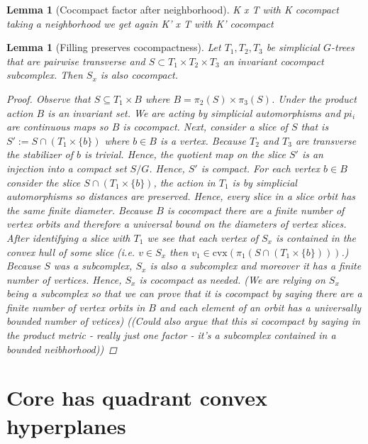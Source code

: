 \documentclass{article}
\theoremstyle{mystyle}
\newtheorem{lem}[thm]{Lemma}
\theoremstyle{remark}
\begin{document}
\begin{lem}
    [Cocompact factor after neighborhood]
    \label{lem:cocompactfactor} 
    K x T with K cocompact taking a neighborhood we get again K' x T with K' cocompact
\end{lem}
\begin{lem} 
[Filling preserves cocompactness]
\label{lem:fillingcocompact}
    Let $T_1,T_2,T_3$ be simplicial $G$-trees that are pairwise transverse and $S\subset T_1\times T_2\times T_3$ an invariant cocompact subcomplex. Then $S_x$ is also cocompact.
\begin{proof}
    Observe that $S\subseteq T_1\times B$ where $B=\pi_2(S)\times \pi_3(S)$. Under the product action $B$ is an invariant set. We are acting by simplicial automorphisms and $pi_i$ are continuous maps so $B$ is cocompact. Next, consider a slice of $S$ that is $S' := S\cap (T_1\times \{b\})$ where $b\in B$ is a vertex. Because $T_2$ and $T_3$ are transverse the stabilizer of $b$ is trivial. Hence, the quotient map on the slice $S'$ is an injection into a compact set $S/G$. Hence, $S'$ is compact. For each vertex $b\in B$ consider the slice $S\cap (T_1\times \{b\})$, the action in $T_1$ is by simplicial automorphisms so distances are preserved. Hence, every slice in a slice orbit has the same finite diameter. Because $B$ is cocompact there are a finite number of vertex orbits and therefore a universal bound on the diameters of vertex slices. After identifying a slice with $T_1$ we see that each vertex of $S_x$ is contained in the convex hull of some slice (i.e. $v\in S_x$ then $v_1\in \text{cvx}(\pi_1(S\cap(T_1\times \{b\})))$.) Because $S$ was a subcomplex, $S_x$ is also a subcomplex and moreover it has a finite number of vertices. Hence, $S_x$ is cocompact as needed. (We are relying on $S_x$ being a subcomplex so that we can prove that it is cocompact by saying there are a finite number of vertex orbits in $B$ and each element of an orbit has a universally bounded number of vetices) ((Could also argue that this si cocompact by saying in the product metric - really just one factor - it's a subcomplex contained in a bounded neibhorhood))

\end{proof}
\end{lem}


\section{Core has quadrant convex hyperplanes}
\end{document}
